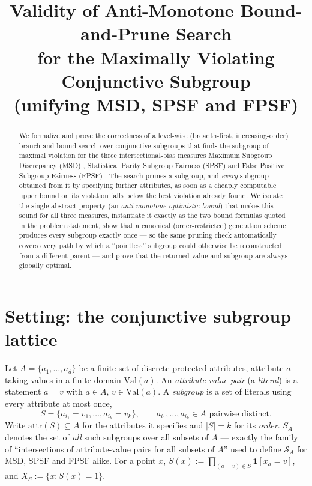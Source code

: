 \documentclass[11pt]{article}
\title{Validity of Anti-Monotone Bound-and-Prune Search\\
for the Maximally Violating Conjunctive Subgroup\\
\large (unifying MSD, SPSF and FPSF)}
\author{}
\date{}
\begin{document}
\maketitle

\begin{abstract}
We formalize and prove the correctness of a level-wise (breadth-first, increasing-order)
branch-and-bound search over conjunctive subgroups that finds the subgroup of maximal
violation for the three intersectional-bias measures Maximum Subgroup Discrepancy (MSD)
\cite{msd}, Statistical Parity Subgroup Fairness (SPSF) and False Positive Subgroup
Fairness (FPSF) \cite{kearns18}. The search prunes a subgroup, and \emph{every} subgroup
obtained from it by specifying further attributes, as soon as a cheaply computable
upper bound on its violation falls below the best violation already found. We isolate
the single abstract property (an \emph{anti-monotone optimistic bound}) that makes this
sound for all three measures, instantiate it exactly as the two bound formulas quoted
in the problem statement, show that a canonical (order-restricted) generation scheme
produces every subgroup exactly once — so the same pruning check automatically covers
every path by which a ``pointless'' subgroup could otherwise be reconstructed from a
different parent — and prove that the returned value and subgroup are always globally
optimal.
\end{abstract}

\section{Setting: the conjunctive subgroup lattice}

Let $A=\{a_1,\dots,a_d\}$ be a finite set of discrete protected attributes, attribute
$a$ taking values in a finite domain $\mathrm{Val}(a)$. An \emph{attribute-value pair}
(a \emph{literal}) is a statement $a\!=\!v$ with $a \in A$, $v\in\mathrm{Val}(a)$. A
\emph{subgroup} is a set of literals using every attribute at most once,
\[
S=\{a_{i_1}\!=\!v_1,\dots,a_{i_k}\!=\!v_k\},\qquad a_{i_1},\dots,a_{i_k}\in A \text{ pairwise distinct.}
\]
Write $\mathrm{attr}(S)\subseteq A$ for the attributes it specifies and $|S|=k$ for its
\emph{order}. $S_A$ denotes the set of \emph{all} such subgroups over all subsets of
$A$ — exactly the family of ``intersections of attribute-value pairs for all subsets
of $A$'' used to define $\mathcal{S}_A$ for MSD, SPSF and FPSF alike. For a point $x$,
$S(x):=\prod_{(a=v)\in S}\mathbf{1}[x_a=v]$, and $X_S:=\{x : S(x)=1\}$.
\end{document}
